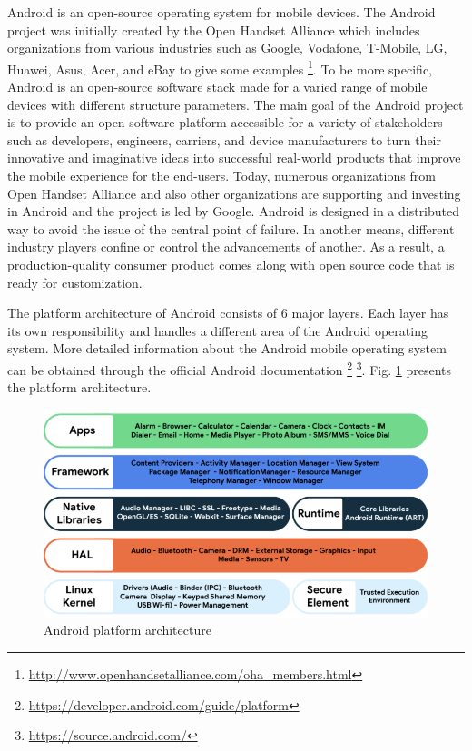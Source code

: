 Android is an open-source operating system for mobile devices. The Android project was initially created by the Open Handset Alliance which includes organizations from various industries such as Google, Vodafone, T-Mobile, LG, Huawei, Asus, Acer, and eBay to give some examples \footnote{\url{http://www.openhandsetalliance.com/oha_members.html}}. To be more specific, Android is an open-source software stack made for a varied range of mobile devices with different structure parameters. The main goal of the Android project is to provide an open software platform accessible for a variety of stakeholders such as developers, engineers, carriers, and device manufacturers to turn their innovative and imaginative ideas into successful real-world products that improve the mobile experience for the end-users. Today, numerous organizations from Open Handset Alliance and also other organizations are supporting and investing in Android and the project is led by Google. Android is designed in a distributed way to avoid the issue of the central point of failure. In another means, different industry players confine or control the advancements of another. As a result, a production-quality consumer product comes along with open source code that is ready for customization.

The platform architecture of Android consists of 6 major layers. Each layer has its own responsibility and handles a different area of the Android operating system. More detailed information about the Android mobile operating system can be obtained through the official Android documentation \footnote{\url{https://developer.android.com/guide/platform}} \footnote{\url{https://source.android.com/}}. Fig. \ref{fig:android_platform_architecture} presents the platform architecture.
\begin{figure}
    \centering
    \includegraphics[scale=0.5]{figures/android_os.png}
    \caption{Android platform architecture}
    \label{fig:android_platform_architecture}
\end{figure}
\FloatBarrier

